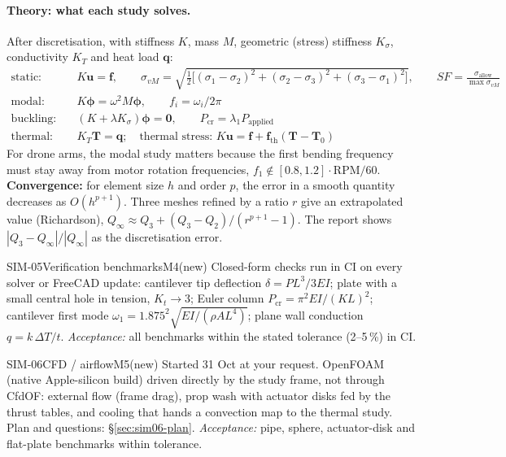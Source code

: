 \paragraph{Theory: what each study solves.} After discretisation, with stiffness $K$, mass $M$, geometric
(stress) stiffness $K_\sigma$, conductivity $K_T$ and heat load $\mathbf q$:
\[
\begin{aligned}
\text{static:}\quad & K\mathbf u=\mathbf f, \qquad \sigma_{vM}=\sqrt{\tfrac12\big[(\sigma_1-\sigma_2)^2+(\sigma_2-\sigma_3)^2+(\sigma_3-\sigma_1)^2\big]},\qquad SF=\frac{\sigma_{\text{allow}}}{\max\sigma_{vM}}\\
\text{modal:}\quad & K\boldsymbol\phi=\omega^2M\boldsymbol\phi,\qquad f_i=\omega_i/2\pi\\
\text{buckling:}\quad & (K+\lambda K_\sigma)\boldsymbol\phi=\mathbf 0,\qquad P_{\text{cr}}=\lambda_1 P_{\text{applied}}\\
\text{thermal:}\quad & K_T\mathbf T=\mathbf q;\quad\text{thermal stress: } K\mathbf u=\mathbf f+\mathbf f_{\text{th}}(\mathbf T-\mathbf T_0)
\end{aligned}
\]
For drone arms, the modal study matters because the first bending frequency must stay away from motor
rotation frequencies, $f_1 \notin [0.8,1.2]\cdot\text{RPM}/60$. \textbf{Convergence:} for element size $h$
and order $p$, the error in a smooth quantity decreases as $O(h^{p+1})$. Three meshes refined by a ratio $r$
give an extrapolated value (Richardson), $Q_\infty\approx Q_3+(Q_3-Q_2)/(r^{p+1}-1)$. The report shows
$|Q_3-Q_\infty|/|Q_\infty|$ as the discretisation error.

\begin{epic}{SIM-05}{Verification benchmarks}{M4}{\stTodo}{(new)}
Closed-form checks run in CI on every solver or FreeCAD update:
cantilever tip deflection $\delta=PL^3/3EI$;
plate with a small central hole in tension, $K_t\to3$;
Euler column $P_{\text{cr}}=\pi^2EI/(KL)^2$;
cantilever first mode $\omega_1=1.875^2\sqrt{EI/(\rho AL^4)}$;
plane wall conduction $q=k\,\Delta T/t$.
\emph{Acceptance:} all benchmarks within the stated tolerance (2--5\,\%) in CI.
\end{epic}

\begin{epic}{SIM-06}{CFD / airflow}{M5}{\stTodo}{(new)}
Started 31 Oct at your request. OpenFOAM (native Apple-silicon build) driven directly by the study frame, not
through CfdOF: external flow (frame drag), prop wash with actuator disks fed by the  thrust
tables, and cooling that hands a convection map to the thermal study. Plan and questions: \S\ref{sec:sim06-plan}.
\emph{Acceptance:} pipe, sphere, actuator-disk and flat-plate benchmarks within tolerance.
\end{epic}

